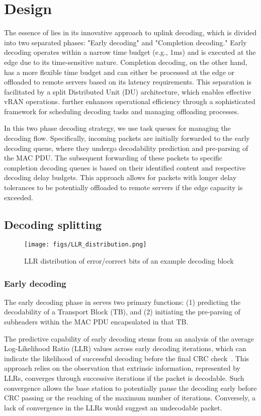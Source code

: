 \section{\Name{} Design}
The essence of \Name{} lies in its innovative approach to uplink decoding, which is divided into two separated phases: "Early decoding" and "Completion decoding." Early decoding operates within a narrow time budget (e.g., 1ms) and is executed at the edge due to its time-sensitive nature. Completion decoding, on the other hand, has a more flexible time budget and can either be processed at the edge or offloaded to remote servers based on its latency requirements. This separation is facilitated by a split Distributed Unit (DU) architecture, which enables effective vRAN operations. \Name{} further enhances operational efficiency through a sophisticated framework for scheduling decoding tasks and managing offloading processes.

In this two phase decoding strategy, we use task queues for managing the decoding flow. Specifically, incoming packets are initially forwarded to the early decoding queue, where they undergo decodability prediction and pre-parsing of the MAC PDU. The subsequent forwarding of these packets to specific completion decoding queues is based on their identified content and respective decoding delay budgets. This approach allows for packets with longer delay tolerances to be potentially offloaded to remote servers if the edge capacity is exceeded.

\subsection{Decoding splitting}

\begin{figure*}
     \centering
  \texttt{[image: figs/LLR\_distribution.png]}
  \caption{LLR distribution of error/correct bits of an example decoding block}
  \label{fig:LLR_distribution}
\end{figure*}


\subsubsection{Early decoding}\label{early_decoding}
The early decoding phase in \Name{} serves two primary functions: (1) predicting the decodability of a Transport Block (TB), and (2) initiating the pre-parsing of subheaders within the MAC PDU encapsulated in that TB.

The predictive capability of early decoding stems from an analysis of the average Log-Likelihood Ratio (LLR) values across early decoding iterations, which can indicate the likelihood of successful decoding before the final CRC check~\cite{EHARQ,LLRhspa,FastHarqURLLC}. This approach relies on the observation that extrinsic information, represented by LLRs, converges through successive iterations if the packet is decodable. Such convergence allows the base station to potentially pause the decoding early before CRC passing or the reaching of the maximum number of iterations. Conversely, a lack of convergence in the LLRs would suggest an undecodable packet.

